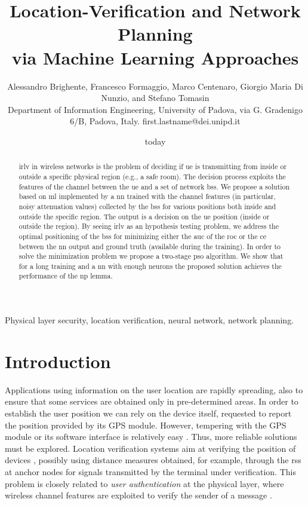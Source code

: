 \documentclass[conference,final]{IEEEtran}
\title{Location-Verification and Network Planning \\ via Machine Learning Approaches}
\author{Alessandro Brighente, Francesco Formaggio, Marco Centenaro, Giorgio Maria Di Nunzio, and    Stefano Tomasin \\ {\small Department of Information Engineering, University of Padova, via G. Gradenigo 6/B, Padova, Italy. first.lastname@dei.unipd.it} }
\date{today}
\begin{document}
\maketitle

\begin{abstract}
\Ac{irlv} in wireless networks is the problem of deciding if  \ac{ue}  is transmitting from inside or outside a specific physical region (e.g., a safe room). The decision process exploits the features of the channel between the \ac{ue} and a set of network \acp{bs}.  We propose a solution based on   \ac{ml} implemented by a \ac{nn} trained with the channel features (in particular, noisy attenuation values) collected by the \acp{bs} for various positions both inside and outside the specific region. The output is a decision on the  \ac{ue} position (inside or outside the region). By seeing  \ac{irlv}  as an hypothesis testing problem, we address the optimal positioning of the \acp{bs} for minimizing either the \ac{auc} of the \ac{roc} or  the \ac{ce} between the \ac{nn} output and ground truth (available during the training). In order to solve the minimization problem we propose a two-stage \ac{pso} algorithm. We show that for a long training and a \ac{nn} with enough neurons the proposed solution achieves the performance of the \ac{np} lemma.
\end{abstract}

\begin{IEEEkeywords}
Physical layer security, location verification, neural network, network planning.
\end{IEEEkeywords}
\glsresetall

\section{Introduction}

Applications using information on the user location are rapidly spreading, also to ensure that some services are obtained only in pre-determined areas. %
In order to establish the user position we can rely on the device itself,  requested to report the position provided by its GPS module. However, tempering with the GPS module  or its  software interface is relatively easy \cite{ceccato2018exploiting}. Thus, more reliable solutions must be explored. Location verification systems aim at verifying the position of devices  \cite{Zeng-survey, 8376254}, possibly using distance measures  obtained, for example, through the \ac{rss} at anchor nodes for signals transmitted by the terminal under verification. This problem is closely related to  {\em user authentication} at the physical layer, where wireless channel features are exploited to verify the sender of a message \cite{7270404}.
\end{document}
